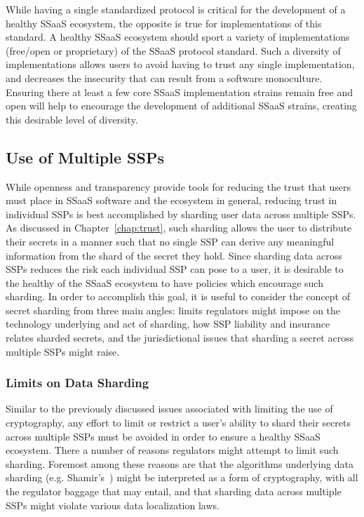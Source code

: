 While having a single standardized protocol is critical for the
development of a healthy SSaaS ecosystem, the opposite is true for
implementations of this standard. A healthy SSaaS ecosystem should
sport a variety of implementations (free/open or proprietary) of the
SSaaS protocol standard. Such a diversity of implementations allows
users to avoid having to trust any single implementation, and
decreases the insecurity that can result from a software
monoculture. Ensuring there at least a few core SSaaS implementation
strains remain free and open will help to encourage the development of
additional SSaaS strains, creating this desirable level of diversity.

\subsection{Use of Multiple SSPs}

While openness and transparency provide tools for reducing the trust
that users must place in SSaaS software and the ecosystem in general,
reducing trust in individual SSPs is best accomplished by sharding
user data across multiple SSPs. As discussed in
Chapter~\ref{chap:trust}, such sharding allows the user to distribute
their secrets in a manner such that no single SSP can derive any
meaningful information from the shard of the secret they hold. Since
sharding data across SSPs reduces the risk each individual SSP can
pose to a user, it is desirable to the healthy of the SSaaS ecosystem
to have policies which encourage such sharding. In order to accomplish
this goal, it is useful to consider the concept of secret sharding
from three main angles: limits regulators might impose on the
technology underlying and act of sharding, how SSP liability and
insurance relates sharded secrets, and the jurisdictional issues that
sharding a secret across multiple SSPs might raise.

\subsubsection{Limits on Data Sharding}

Similar to the previously discussed issues associated with limiting
the use of cryptography, any effort to limit or restrict a user's
ability to shard their secrets across multiple SSPs must be avoided in
order to ensure a healthy SSaaS ecosystem. There a number of reasons
regulators might attempt to limit such sharding. Foremost among these
reasons are that the algorithms underlying data sharding
(e.g. Shamir's~\cite{shamir1979}) might be interpreted as a form of
cryptography, with all the regulator baggage that may entail, and that
sharding data across multiple SSPs might violate various data
localization laws.

